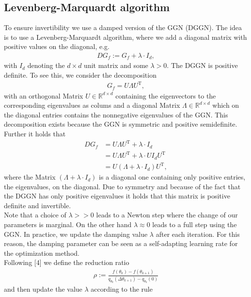 \documentclass[conference]{IEEEtran}
\begin{document}
	\subsection{Levenberg-Marquardt algorithm }
	\noindent
	To ensure invertibility we use a damped version of the GGN (DGGN). The idea is to use a Levenberg-Marquardt algorithm, where we add a diagonal matrix with positive values on the diagonal, e.g.
	\begin{align}
	DG_{f} := G_{f} + \lambda\cdot I_{d},
	\end{align}
	with $I_{d}$ denoting the $d\times d$ unit matrix and some $\lambda>0$.
	The DGGN is positive definite.
	To see this, we consider the decomposition
	\begin{align}
	G_{f} = U\Lambda U^{\mathrm{T}},
	\end{align}
	with an orthogonal Matrix $U\in\mathbb{R}^{d\times d}$ containing the eigenvectors to the corresponding eigenvalues as colums and a diagonal Matrix $\Lambda\in\mathbb{R}^{d\times d}$ which on the diagonal entries contains the nonnegative eigenvalues of the GGN. This decomposition exists because the GGN is symmetric and positive semidefinite. Further it holds that
	\begin{align}
	DG_{f} &= U\Lambda U^{\mathrm{T}} + \lambda\cdot I_{d}\\
	&= U\Lambda U^{\mathrm{T}} + \lambda\cdot U I_{d}U^{\mathrm{T}}\\
	&= U\left(\Lambda + \lambda\cdot I_{d}\right)U^{\mathrm{T}},
	\end{align}
	where the Matrix $\left(\Lambda + \lambda\cdot I_{d}\right)$ is a diagonal one containing only positive entries, the eigenvalues, on the diagonal. Due to symmetry and because of the fact that the DGGN has only positive eigenvalues it holds that this matrix is positive definite and invertible.\\
	Note that a choice of $\lambda>>0$ leads to a Newton step where the change of our parameters is marginal. On the other hand $\lambda\approx 0$ leads to a full step using the GGN. In practice, we update the damping value $\lambda$ after each iteration. For this reason, the damping parameter can be seen as a self-adapting learning rate for the optimization method.\\
	Following [4] we define the reduction ratio
	\begin{align}
	\rho := \frac{f(\theta_{k}) - f(\theta_{k+1})}{q_{\theta_{k}}(\Delta\theta_{k + 1}) - q_{\theta_{k}}(0)}
	\end{align}
	and then update the value $\lambda$ according to the rule
\end{document}
